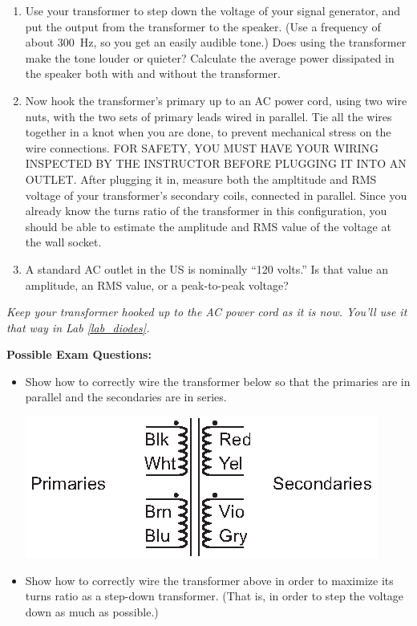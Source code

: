 \begin{enumerate}

\item Use your transformer to step down the voltage of your signal generator, and put the output from the transformer to the speaker.  (Use a frequency of about 300~Hz, so you get an easily audible tone.)  Does using the transformer make the tone louder or quieter?  Calculate the average power dissipated in the speaker both with and without the transformer.  

\item Now hook the transformer's primary up to an AC power cord, using two wire nuts, with the two sets of primary leads wired in parallel.  Tie all the wires together in a knot when you are done, to prevent mechanical stress on the wire connections.  FOR SAFETY, YOU MUST HAVE YOUR WIRING INSPECTED BY THE INSTRUCTOR BEFORE PLUGGING IT INTO AN OUTLET.  After plugging it in, measure both the ampltitude and RMS voltage of your transformer's secondary coils, connected in parallel.  Since you already know the turns ratio of the transformer in this configuration, you should be able to estimate the amplitude and RMS value of the voltage at the wall socket.  

\item A standard AC outlet in the US is nominally ``120 volts.''  Is that value an amplitude, an RMS value, or a peak-to-peak voltage? 

\end{enumerate}

\textit{Keep your transformer hooked up to the AC power cord as it is now.  You'll use it that way in Lab \ref{lab_diodes}.}

\bigskip

\textbf{Possible Exam Questions:}

\begin{itemize}

\item Show how to correctly wire the transformer below so that the primaries are in parallel and the secondaries are in series.

\begin{center}
\includegraphics{transformers/transformer_wiring.eps}
\end{center}

\item Show how to correctly wire the transformer above in order to maximize its turns ratio as a step-down transformer.  (That is, in order to step the voltage down as much as possible.)

\end{itemize}



